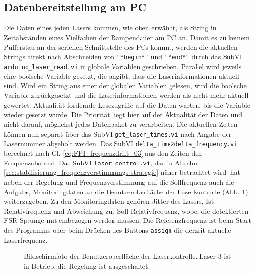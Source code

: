 \subsection{Datenbereitstellung am PC}\label{subsec:datenbereitstellung}
Die Daten eines jeden Lasers kommen, wie oben erwähnt, als String in
Zeitabständen eines Vielfachen der Rampendauer am PC an. Damit es zu keinem Pufferstau an
der seriellen Schnittstelle des PCs kommt, werden die aktuellen Strings direkt
nach Abschneiden von \lstinline|"*begin*"| und \lstinline|"*end*"| durch das
SubVI \lstinline|arduino_laser_read.vi| in globale Variablen geschrieben.
Parallel wird jeweils eine boolsche Variable gesetzt, die angibt, dass die Laserinformationen aktuell sind. Wird ein String aus einer der
globalen Variablen gelesen, wird die boolsche Variable zurückgesetzt und die
Laserinformationen werden als nicht mehr aktuell gewertet. Aktualität fordernde
Lesezugriffe auf die Daten warten, bis die Variable wieder gesetzt wurde. Die
Priorität liegt hier auf der Aktualität der Daten und nicht darauf, möglichst
jedes Datenpaket zu verarbeiten. Die aktuellen Zeiten können nun separat über
das SubVI \lstinline|get_laser_times.vi| nach Angabe der Lasernummer abgeholt
werden. Das SubVI \lstinline|delta_time2delta_frequency.vi| berechnet nach Gl.
\eqref{eq:FPI_frequenzdrift_03} aus den Zeiten den Frequenzabstand. Das SubVI
\lstinline|laser-control.vi|, das in Abschn.
\ref{sec:stabilisierung_frequenzverstimmungs-strategie} näher betrachtet wird,
hat neben der Regelung und Frequenzverstimmung auf die Sollfrequenz auch die Aufgabe, Monitoringdaten an die Benutzeroberfläche der Laserkontrolle (Abb.
\ref{fig:benutzeroberflaeche_laserkontrolle}) weiterzugeben. Zu den
Monitoringdaten gehören Jitter des Lasers, Ist-Relativfrequenz und Abweichung
zur Soll-Relativfrequenz, wobei die detektierten FSR-Sprünge mit einbezogen
werden müssen. Die Referenzfrequenz ist beim Start des Programms oder beim
Drücken des Buttons \lstinline|assign| die derzeit aktuelle Laserfrequenz.
\begin{figure}[h]
 	\centering
	\caption[Benutzeroberfläche -
	Laserkontrolle]{Bildschirmfoto der Benutzeroberfläche der Laserkontrolle. Laser
	3 ist in Betrieb, die Regelung ist ausgeschaltet.}
	\label{fig:benutzeroberflaeche_laserkontrolle}
\end{figure}

